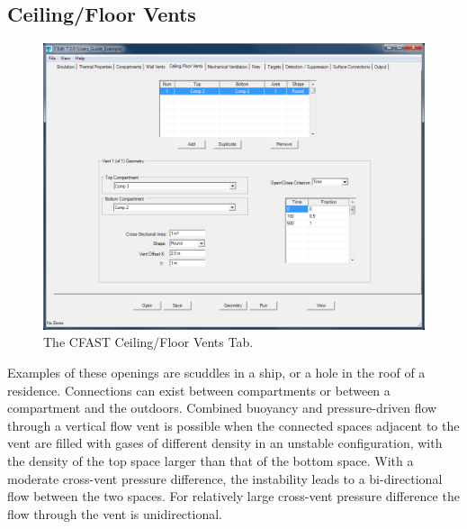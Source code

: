 \subsection{Ceiling/Floor Vents}
\label{info:VENT2}
\begin{figure}[h!]
\includegraphics[width=6.5in]{FIGURES/Vertical_Flow_Tab}
\caption[The CFAST Ceiling/Floor Vents Tab]{The CFAST Ceiling/Floor Vents Tab.}
\end{figure}

Examples of these openings are scuddles in a ship, or a hole in the roof of a residence. Connections can exist between compartments or between a compartment and the outdoors. Combined buoyancy and pressure-driven flow through a vertical flow vent is possible when the connected spaces adjacent to the vent are filled with gases of different density in an unstable configuration, with the density of the top space larger than that of the bottom space. With a moderate cross-vent pressure difference, the instability leads to a bi-directional flow between the two spaces. For relatively large cross-vent pressure difference the flow through the vent is unidirectional.


